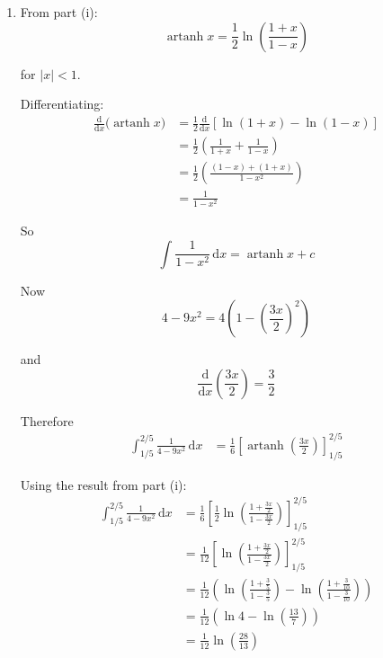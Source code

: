 \documentclass[leqno]{article}
\begin{document}
\begin{enumerate}[
  label=\textbf{\arabic*.},
  leftmargin=*,
  topsep=0pt,
  partopsep=0pt,
  parsep=0pt
]
\begin{djsSolution}
\begin{enumerate}[label=\textbf{(\roman*)}]
Hence
\[
y=\frac{1}{2}\ln\left(\frac{1+x}{1-x}\right)
\]

So the required result is shown.

Since $\operatorname{artanh}x$ is the inverse of $\tanh y$, this means
\[
\operatorname{artanh}x=\frac{1}{2}\ln\left(\frac{1+x}{1-x}\right)
\]

\item From part (i):
\[
\operatorname{artanh}x=\frac12\ln\left(\frac{1+x}{1-x}\right)
\]

for $|x|<1$.

Differentiating:
\begin{align*}
\frac{\mathrm{d}}{\mathrm{d}x}\bigl(\operatorname{artanh}x\bigr)
&=\frac12\frac{\mathrm{d}}{\mathrm{d}x}\left[\ln(1+x)-\ln(1-x)\right] \\
&=\frac12\left(\frac{1}{1+x}+\frac{1}{1-x}\right) \\
&=\frac12\left(\frac{(1-x)+(1+x)}{1-x^2}\right) \\
&=\frac{1}{1-x^2}
\end{align*}

So
\[
\int \frac{1}{1-x^2}\,\mathrm{d}x=\operatorname{artanh}x+c
\]

Now
\[
4-9x^2=4\left(1-\left(\frac{3x}{2}\right)^2\right)
\]

and
\[
\frac{\mathrm{d}}{\mathrm{d}x}\left(\frac{3x}{2}\right)=\frac32
\]

Therefore
\begin{align*}
\int_{1/5}^{2/5}\frac{1}{4-9x^2}\,\mathrm{d}x
&=\frac16\left[\operatorname{artanh}\left(\frac{3x}{2}\right)\right]_{1/5}^{2/5}
\end{align*}

Using the result from part (i):
\begin{align*}
\int_{1/5}^{2/5}\frac{1}{4-9x^2}\,\mathrm{d}x
&=\frac{1}{6}\left[\frac12\ln\left(\frac{1+\frac{3x}{2}}{1-\frac{3x}{2}}\right)\right]_{1/5}^{2/5} \\
&=\frac{1}{12}\left[\ln\left(\frac{1+\frac{3x}{2}}{1-\frac{3x}{2}}\right)\right]_{1/5}^{2/5} \\
&=\frac{1}{12}\left(\ln\left(\frac{1+\frac35}{1-\frac35}\right)-\ln\left(\frac{1+\frac{3}{10}}{1-\frac{3}{10}}\right)\right) \\
&=\frac{1}{12}\left(\ln 4-\ln\left(\frac{13}{7}\right)\right) \\
&=\frac{1}{12}\ln\left(\frac{28}{13}\right)
\end{align*}
\end{enumerate}
\end{djsSolution}



\end{enumerate}
\end{document}
